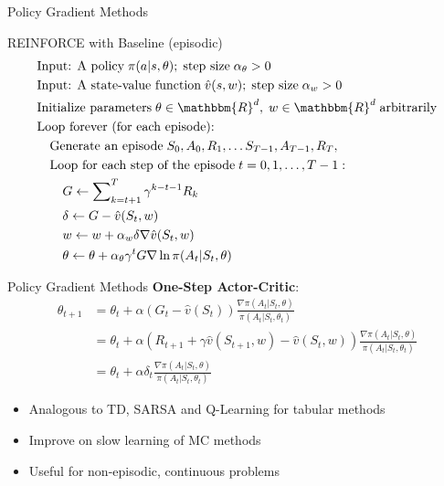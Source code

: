 \documentclass[ignorenonframetext,xcolor=x11names]{beamer}
\begin{document}
\begin{frame}{Policy Gradient Methods}
\begin{block}{REINFORCE with Baseline (episodic)}
\vspace{-.5\baselineskip}
\begin{align*}
& \text{Input: A policy}\;\pi(a | s, \theta);\;\text{step size}\; \alpha_\theta > 0 \\
& \text{Input: A state-value function}\;\hat{v}(s, w);\;\text{step size}\; \alpha_w > 0 \\
& \text{Initialize parameters}\; \theta \in \mathbbm{R}^d,\; w \in \mathbbm{R}^d\;\text{arbitrarily} \\
& \text{Loop forever (for each episode):} \\
& \quad \text{Generate an episode}\; S_0, A_0, R_1, \ldots S_{T-1}, A_{T-1}, R_T, \\
& \quad \text{Loop for each step of the episode}\;t=0, 1, \ldots, T-1:\\
& \quad \quad G \leftarrow \sum\nolimits_{k=t+1}^T \gamma^{k - t - 1}R_k \\
& \quad \quad \delta \leftarrow G - \hat{v}(S_t, w) \\
& \quad \quad w \leftarrow w + \alpha_w \delta \nabla \hat{v}(S_t, w) \\
& \quad \quad \theta \leftarrow \theta + \alpha_\theta \gamma^t G \nabla \ln \pi(A_t | S_t, \theta)
\end{align*}
\vspace{-.5\baselineskip}
\end{block}
\end{frame}


\begin{frame}{Policy Gradient Methods}
\textbf{One-Step Actor-Critic}:
\begin{align*}
\theta_{t+1} &= \theta_t + \alpha (G_{t} - \hat{v}(S_t)) \frac{\nabla \pi(A_t | S_t, \theta)}{\pi(A_t | S_t, \theta_t)} \\
&= \theta_t + \alpha (R_{t+1} + \gamma \hat{v}(S_{t+1}, w) - \hat{v}(S_t, w)) \frac{\nabla \pi(A_t | S_t, \theta)}{\pi(A_t | S_t, \theta_t)} \\
&= \theta_t + \alpha \delta_t \frac{\nabla \pi(A_t | S_t, \theta)}{\pi(A_t | S_t, \theta_t)}
\end{align*}
\begin{itemize}
  \item Analogous to TD, SARSA and Q-Learning for tabular methods
  \item Improve on slow learning of MC methods
  \item Useful for non-episodic, continuous problems
\end{itemize}
\end{frame}
\end{document}
